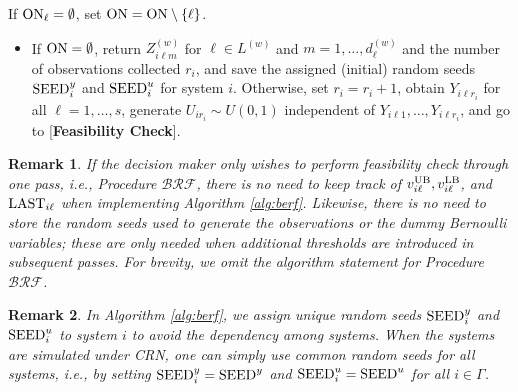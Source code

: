 \documentclass[11pt]{article}
\newtheorem{remark}{Remark}
\begin{document}
\begin{algorithm}[h!]
{\begin{algorithmic}
\begin{itemize}
		\end{itemize}
        \EndFor     
        \State If ${\rm ON}_\ell = \emptyset$, set ${\rm ON} = {\rm ON}\setminus \{\ell\}$.
        \EndFor
		 \begin{itemize}%
			\item[] If ${\rm ON}=\emptyset$, return $Z_{i\ell m}^{(w)}$ for $\ell\in L^{(w)}$ and $m=1,\ldots,d_\ell^{(w)}$ and the number of observations collected $r_i$, and save the assigned (initial) random seeds ${\rm SEED}^y_i$ and ${\rm SEED}^u_i$ for system $i$. Otherwise, set $r_i=r_i+1$, obtain $Y_{i\ell r_i}$ for all $\ell=1,\ldots,s$, generate $U_{ir_i}\sim U(0,1)$ independent of $Y_{i\ell 1},\ldots, Y_{i\ell r_i}$, and go to [{\bf Feasibility Check}]. 
		\end{itemize} 
    \EndFor
    \end{algorithmic}
}
\end{algorithm}



\begin{remark}
    If the decision maker only wishes to perform feasibility check through one pass, i.e., Procedure $\mathcal{BRF}$, there is no need to keep track of $v_{i\ell}^{\rm UB}, v_{i\ell}^{\rm LB}$, and ${\rm LAST}_{i\ell}$ when implementing Algorithm \ref{alg:berf}. Likewise, there is no need to store the random seeds used to generate the observations or the dummy Bernoulli variables; these are only needed when additional thresholds are introduced in subsequent passes. For brevity, we omit the algorithm statement for Procedure $\mathcal{BRF}$.
\end{remark}


\begin{remark}
    In Algorithm \ref{alg:berf}, we assign unique random seeds ${\rm SEED}^y_i$ and ${\rm SEED}^u_i$ to system $i$ to avoid the dependency among systems. When the systems are simulated under CRN, one can simply use common random seeds for all systems, i.e., by setting ${\rm SEED}_i^y={\rm SEED}^y$ and ${\rm SEED}_i^u={\rm SEED}^u$ for all $i\in\Gamma$.
\end{remark}
\end{document}
